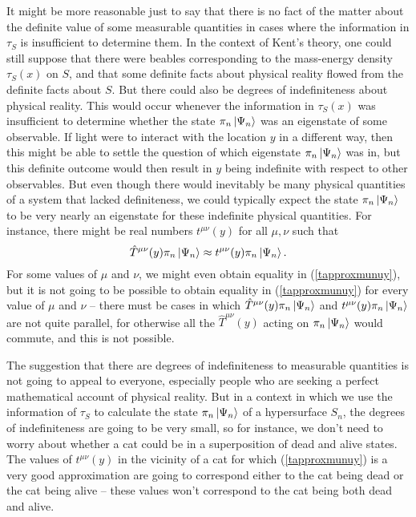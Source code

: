 It might be more reasonable just to say that there is no fact of the matter about the definite value of some measurable quantities in cases where the information in $\tau_S$ is insufficient to determine them.  In the context of Kent's theory, one could still suppose that there were beables corresponding to the mass-energy density $\tau_S(x)$ on $S$, and that some definite facts about physical reality flowed from the definite facts about $S$. But there could also be degrees of indefiniteness about physical reality. This would occur whenever the information in $\tau_S(x)$ was insufficient to determine whether the state $\pi_n\ket{\Psi_n}$ was an eigenstate of some observable. If light were to interact with the location $y$ in a different way, then this might be able to settle the question of which eigenstate $\pi_n\ket{\Psi_n}$ was in, but this definite outcome would then result in $y$ being indefinite with respect to other observables. But even though there would inevitably be many physical quantities of a system that lacked definiteness, we could typically expect the state $\pi_n\ket{\Psi_n}$ to be very nearly an eigenstate for these indefinite physical quantities. For instance, there might be real numbers $t^{\mu\nu}(y)$ for all $\mu, \nu$ such that 
\begin{equation}\label{tapproxmunuy}
\hat{T}^{\mu\nu}(y)\pi_n\ket{\Psi_n}\approx t^{\mu\nu}(y)\pi_n\ket{\Psi_n}.
\end{equation}
For some values of $\mu$ and $\nu$, we might even obtain equality in (\ref{tapproxmunuy}), but it is not going to be possible to obtain equality in (\ref{tapproxmunuy}) for every value of $\mu$ and $\nu$ -- there must be cases in which $\hat{T}^{\mu\nu}(y)\pi_n\ket{\Psi_n}$ and $t^{\mu\nu}(y)\pi_n\ket{\Psi_n}$ are not quite parallel, for otherwise all the $\hat{T}^{\mu\nu}(y)$  acting on $\pi_n\ket{\Psi_n}$ would commute, and this is not possible. 

The suggestion that there are degrees of indefiniteness to measurable quantities is not going to appeal to everyone, especially people who are seeking a perfect mathematical account of physical reality. But in a context in which we use the information of $\tau_S$ to calculate the state $\pi_n\ket{\Psi_n}$ of a hypersurface $S_n$, the degrees of indefiniteness are going to be very small, so for instance, we don't need to worry about whether a cat could be in a superposition of dead and alive states. The values of $t^{\mu\nu}(y)$ in the vicinity of a cat for which (\ref{tapproxmunuy}) is a very good approximation are going to correspond either to the cat being dead or the cat being alive -- these values won't correspond to the cat being both dead and alive.

